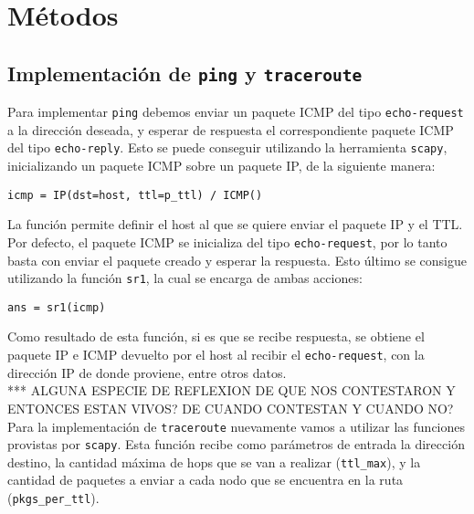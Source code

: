 \section{M\'etodos}
 
 \subsection{Implementaci\'on de \texttt{ping} y \texttt{traceroute}}
 
 Para implementar \texttt{ping} debemos enviar un paquete ICMP del tipo \texttt{echo-request} a la direcci\'on deseada, y esperar de respuesta el correspondiente paquete ICMP del tipo \texttt{echo-reply}. Esto se puede conseguir utilizando la herramienta \texttt{scapy}, inicializando un paquete ICMP sobre un paquete IP, de la siguiente manera:\\
 
 \begin{center}
    \texttt{icmp = IP(dst=host, ttl=p\_ttl) / ICMP()}
 \end{center}
 
 La funci\'on permite definir el host al que se quiere enviar el paquete IP y el TTL. Por defecto, el paquete ICMP se inicializa del tipo \texttt{echo-request}, por lo tanto basta con enviar el paquete creado y esperar la respuesta. Esto \'ultimo se consigue utilizando la funci\'on \texttt{sr1}, la cual se encarga de ambas acciones:
 
 \begin{center}
    \texttt{ans = sr1(icmp)}
 \end{center}
 
 Como resultado de esta funci\'on, si es que se recibe respuesta, se obtiene el paquete IP e ICMP devuelto por el host al recibir el \texttt{echo-request}, con la direcci\'on IP de donde proviene, entre otros datos.\\
 *** ALGUNA ESPECIE DE REFLEXION DE QUE NOS CONTESTARON Y ENTONCES ESTAN VIVOS? DE CUANDO CONTESTAN Y CUANDO NO?\\
 
 Para la implementaci\'on de \texttt{traceroute} nuevamente vamos a utilizar las funciones provistas por \texttt{scapy}. Esta funci\'on recibe como par\'ametros de entrada la direcci\'on destino, la cantidad m\'axima de hops que se van a realizar (\texttt{ttl\_max}), y la cantidad de paquetes a enviar a cada nodo que se encuentra en la ruta (\texttt{pkgs\_per\_ttl}).\\
 
